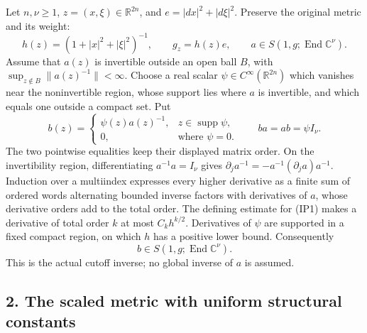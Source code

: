 \documentclass[
  11pt,
]{article}
\begin{document}
Let \(n,\nu\ge1\), \(z=(x,\xi)\in\mathbb R^{2n}\), and
\(e=|dx|^2+|d\xi|^2\). Preserve the original metric and its weight: \[
 h(z)=(1+|x|^2+|\xi|^2)^{-1},\qquad
 g_z=h(z)e,\qquad
 a\in S(1,g;\operatorname{End}\mathbb C^\nu).
 \tag{IP1}
\] Assume that \(a(z)\) is invertible outside an open ball \(B\), with
\(\sup_{z\notin B}\|a(z)^{-1}\|<\infty\). Choose a real scalar
\(\psi\in C^\infty(\mathbb R^{2n})\) which vanishes near the
noninvertible region, whose support lies where \(a\) is invertible, and
which equals one outside a compact set. Put \[
 b(z)=
 \begin{cases}\psi(z)a(z)^{-1},&z\in\operatorname{supp}\psi,\\
 0,&\text{where }\psi=0.\end{cases}
 \qquad ba=ab=\psi I_\nu .
 \tag{IP2}
\] The two pointwise equalities keep their displayed matrix order. On
the invertibility region, differentiating \(a^{-1}a=I_\nu\) gives
\(\partial_j a^{-1}=-a^{-1}(\partial_j a)a^{-1}\). Induction over a
multiindex expresses every higher derivative as a finite sum of ordered
words alternating bounded inverse factors with derivatives of \(a\),
whose derivative orders add to the total order. The defining estimate
for (IP1) makes a derivative of total order \(k\) at most
\(C_k h^{k/2}\). Derivatives of \(\psi\) are supported in a fixed
compact region, on which \(h\) has a positive lower bound. Consequently
\[
 b\in S(1,g;\operatorname{End}\mathbb C^\nu).
 \tag{IP3}
\] This is the actual cutoff inverse; no global inverse of \(a\) is
assumed.

\subsection{2. The scaled metric with uniform structural
constants}\label{the-scaled-metric-with-uniform-structural-constants}
\end{document}
